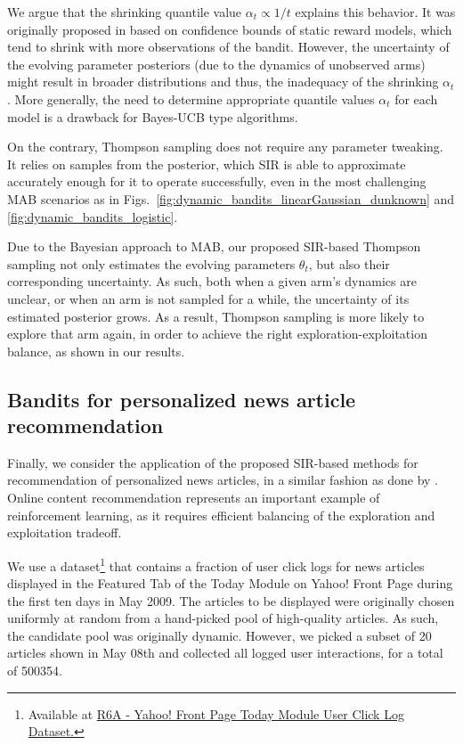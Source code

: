 \documentclass{article}
\begin{document}
We argue that the shrinking quantile value $\alpha_t\propto1/t$ explains this behavior. It was originally proposed in \cite{ip-Kaufmann2012} based on confidence bounds of static reward models, which tend to shrink with more observations of the bandit. However, the uncertainty of the evolving parameter posteriors (due to the dynamics of unobserved arms) might result in broader distributions and thus, the inadequacy of the shrinking $\alpha_t$. More generally, the need to determine appropriate quantile values $\alpha_t$ for each model is a drawback for Bayes-UCB type algorithms.

On the contrary, Thompson sampling does not require any parameter tweaking. It relies on samples from the posterior, which SIR is able to approximate accurately enough for it to operate successfully, even in the most challenging MAB scenarios as in Figs.~\ref{fig:dynamic_bandits_linearGaussian_dunknown} and \ref{fig:dynamic_bandits_logistic}.

Due to the Bayesian approach to MAB, our proposed SIR-based Thompson sampling not only estimates the evolving parameters $\theta_t$, but also their corresponding uncertainty. As such, both when a given arm's dynamics are unclear, or when an arm is not sampled for a while, the uncertainty of its estimated posterior grows. As a result, Thompson sampling is more likely to explore that arm again, in order to achieve the right exploration-exploitation balance, as shown in our results.

\subsection{Bandits for personalized news article recommendation}
\label{ssec:logged_data_bandits}

Finally, we consider the application of the proposed SIR-based methods for recommendation of personalized news articles, in a similar fashion as done by \citet{ic-Chapelle2011}. Online content recommendation represents an important example of reinforcement learning, as it requires efficient balancing of the exploration and exploitation tradeoff.

We use a dataset\footnote{Available at \href{https://webscope.sandbox.yahoo.com/catalog.php?datatype=r\&did=49}{R6A - Yahoo! Front Page Today Module User Click Log Dataset.}} that contains a fraction of user click logs for news articles displayed in the Featured Tab of the Today Module on Yahoo! Front Page during the first ten days in May 2009. The articles to be displayed were originally chosen uniformly at random from a hand-picked pool of high-quality articles. As such, the candidate pool was originally dynamic. However, we picked a subset of 20 articles shown in May 08th and collected all logged user interactions, for a total of 500354.
\end{document}
